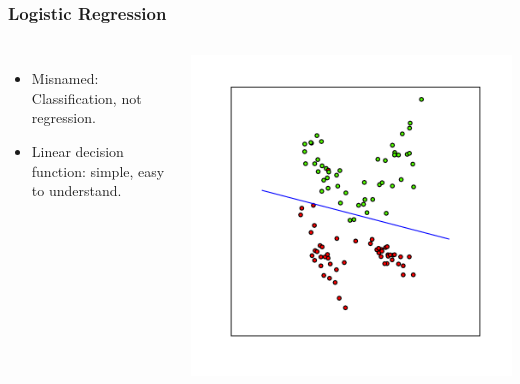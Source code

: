 \begin{frame}
    \frametitle{Logistic Regression}
    \begin{columns}
            \begin{itemize}
                \item Misnamed: Classification, not regression.
                \item Linear decision function: simple, easy to understand.
            \end{itemize}
            \includegraphics[width=1\linewidth]{logreg-pics/synthetic_line}\\

    \end{columns}
\end{frame}

